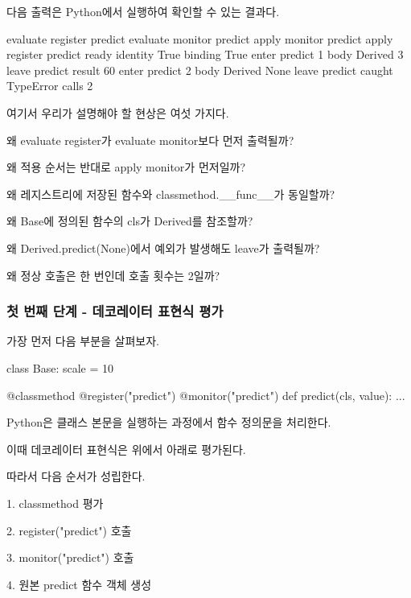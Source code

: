 다음 출력은 Python에서 실행하여 확인할 수 있는 결과다.

\begin{dhkzsh}
evaluate register predict
evaluate monitor predict
apply monitor predict
apply register predict
ready
identity True
binding True
enter predict 1
body Derived 3
leave predict
result 60
enter predict 2
body Derived None
leave predict
caught TypeError
calls 2
\end{dhkzsh}

여기서 우리가 설명해야 할 현상은 여섯 가지다.

\begin{dhksmry}
왜 evaluate register가 evaluate monitor보다 먼저 출력될까?

왜 적용 순서는 반대로 apply monitor가 먼저일까?

왜 레지스트리에 저장된 함수와 classmethod.__func__가 동일할까?

왜 Base에 정의된 함수의 cls가 Derived를 참조할까?

왜 Derived.predict(None)에서 예외가 발생해도 leave가 출력될까?

왜 정상 호출은 한 번인데 호출 횟수는 2일까?
\end{dhksmry}

\subsubsection{첫 번째 단계 - 데코레이터 표현식 평가}

가장 먼저 다음 부분을 살펴보자.

\begin{dhkcode}
class Base:
    scale = 10

    @classmethod
    @register("predict")
    @monitor("predict")
    def predict(cls, value):
        ...
\end{dhkcode}

Python은 클래스 본문을 실행하는 과정에서  함수 정의문을 처리한다.

이때 데코레이터 표현식은 위에서 아래로 평가된다.

따라서 다음 순서가 성립한다.

\begin{dhksmry}
    1. classmethod 평가

    2. register("predict") 호출

    3. monitor("predict") 호출

    4. 원본 predict 함수 객체 생성
\end{dhksmry}

